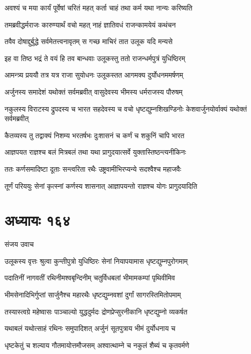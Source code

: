 \twolineshloka
{अवश्यं च मया कार्यं पूर्वेषां चरितं महत्}
{कर्ता चाहं तथा कर्म यथा नान्यः करिष्यति}


\twolineshloka
{तमब्रवीद्धर्मराजः कारुण्यार्थं वचो महत्}
{नाहं ज्ञातिवधं राजन्कामयेयं कथंचन}


\twolineshloka
{तवैव दोषाद्दुर्बुद्धे सर्वमेतत्त्वनावृतम्}
{स गच्छ माचिरं तात उलूक यदि मन्यसे}


\twolineshloka
{इह वा तिष्ठ भद्रं ते वयं हि तव बान्धवाः}
{उलूकस्तु ततो राजन्धर्मपुत्रं युधिष्ठिरम्}


\twolineshloka
{आमन्त्र्य प्रययौ तत्र यत्र राजा सुयोधनः}
{उलूकस्तत आगमक्य दुर्योधनममर्षणम्}


\twolineshloka
{अर्जुनस्य समादेशं यथोक्तं सर्वमब्रवीत्}
{वासुदेवस्य भीमस्य धर्मराजस्य पौरुषम्}


\threelineshloka
{नकुलस्य विराटस्य द्रुपदस्य च भारत}
{सहदेवस्य च वचो धृष्टद्युम्नशिखण्डिनोः}
{केशवार्जुनयोर्वाक्यं यथोक्तं सर्वमब्रवीत्}


\twolineshloka
{कैतव्यस्य तु तद्वाक्यं निशम्य भरतर्षभः}
{दुःशासनं च कर्णं च शकुनिं चापि भारत}


\twolineshloka
{आज्ञपयत राज्ञश्च बलं मित्रबलं तथा}
{यथा प्रागुदयात्सर्वे युक्तास्तिष्ठन्त्यनीकिनः}


\twolineshloka
{ततः कर्णसमादिष्टा दूताः सन्त्वरिता रथैः}
{उष्ट्रवामीभिरप्यन्ये सदश्वैश्च महाजवैः}


\twolineshloka
{तूर्णं परिययुः सेनां कृत्स्नां कर्णस्य शासनात्}
{आज्ञापयन्तो राज्ञश्च योगः प्रागुदयादिति}


\chapter{अध्यायः १६४}
\twolineshloka
{संजय उवाच}
{}


\twolineshloka
{उलूकस्य वृत्तः श्रुत्वा कुन्तीपुत्रो युधिष्ठिरः}
{सेनां नियापयामास धृष्टद्युम्नपुरोगमाम्}


\twolineshloka
{पदातिनीं नागवतीं रथिनीमश्वबृन्दिनीम्}
{चतुर्विधबलां भीमामकम्पां पृथिवीमिव}


\twolineshloka
{भीमसेनादिभिर्गुप्तां सार्जुनैश्च महारथैः}
{धृष्टद्युम्नवशां दुर्गां सागरस्तिमितोपमाम्}


\twolineshloka
{तस्यास्त्वग्रे महेष्वासः पाञ्चाल्यो युद्धदुर्मदः}
{द्रोणप्रेप्सुरनीकानि धृष्टद्युम्नो व्यकर्षत}


\twolineshloka
{यथाबलं यथोत्साहं रथिनः समुपादिशत्}
{अर्जुनं सूतपुत्राय भीमं दुर्योधनाय च}


\twolineshloka
{धृष्टकेतुं च शल्याय गौतमायोत्तमौजसम्}
{अश्वात्थाम्ने च नकुलं शैब्यं च कृतवर्मणे}


